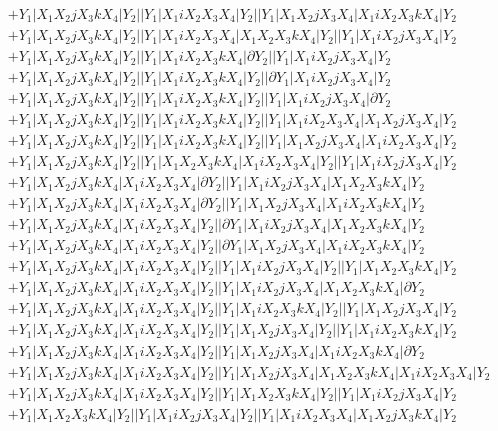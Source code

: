 \documentclass{article}[12pt]
\begin{document}
\begin{align*} 
 & +Y_1|X_1X_2jX_3kX_4|Y_2||Y_1|X_1iX_2X_3X_4|Y_2||Y_1|X_1X_2jX_3X_4|X_1iX_2X_3kX_4|Y_2\\ 
 & +Y_1|X_1X_2jX_3kX_4|Y_2||Y_1|X_1iX_2X_3X_4|X_1X_2X_3kX_4|Y_2||Y_1|X_1iX_2jX_3X_4|Y_2\\ 
 & +Y_1|X_1X_2jX_3kX_4|Y_2||Y_1|X_1iX_2X_3kX_4|\partial Y_2||Y_1|X_1iX_2jX_3X_4|Y_2\\ 
 & +Y_1|X_1X_2jX_3kX_4|Y_2||Y_1|X_1iX_2X_3kX_4|Y_2||\partial Y_1|X_1iX_2jX_3X_4|Y_2\\ 
 & +Y_1|X_1X_2jX_3kX_4|Y_2||Y_1|X_1iX_2X_3kX_4|Y_2||Y_1|X_1iX_2jX_3X_4|\partial Y_2\\ 
 & +Y_1|X_1X_2jX_3kX_4|Y_2||Y_1|X_1iX_2X_3kX_4|Y_2||Y_1|X_1iX_2X_3X_4|X_1X_2jX_3X_4|Y_2\\ 
 & +Y_1|X_1X_2jX_3kX_4|Y_2||Y_1|X_1iX_2X_3kX_4|Y_2||Y_1|X_1X_2jX_3X_4|X_1iX_2X_3X_4|Y_2\\ 
 & +Y_1|X_1X_2jX_3kX_4|Y_2||Y_1|X_1X_2X_3kX_4|X_1iX_2X_3X_4|Y_2||Y_1|X_1iX_2jX_3X_4|Y_2\\ 
 & +Y_1|X_1X_2jX_3kX_4|X_1iX_2X_3X_4|\partial Y_2||Y_1|X_1iX_2jX_3X_4|X_1X_2X_3kX_4|Y_2\\ 
 & +Y_1|X_1X_2jX_3kX_4|X_1iX_2X_3X_4|\partial Y_2||Y_1|X_1X_2jX_3X_4|X_1iX_2X_3kX_4|Y_2\\ 
 & +Y_1|X_1X_2jX_3kX_4|X_1iX_2X_3X_4|Y_2||\partial Y_1|X_1iX_2jX_3X_4|X_1X_2X_3kX_4|Y_2\\ 
 & +Y_1|X_1X_2jX_3kX_4|X_1iX_2X_3X_4|Y_2||\partial Y_1|X_1X_2jX_3X_4|X_1iX_2X_3kX_4|Y_2\\ 
 & +Y_1|X_1X_2jX_3kX_4|X_1iX_2X_3X_4|Y_2||Y_1|X_1iX_2jX_3X_4|Y_2||Y_1|X_1X_2X_3kX_4|Y_2\\ 
 & +Y_1|X_1X_2jX_3kX_4|X_1iX_2X_3X_4|Y_2||Y_1|X_1iX_2jX_3X_4|X_1X_2X_3kX_4|\partial Y_2\\ 
 & +Y_1|X_1X_2jX_3kX_4|X_1iX_2X_3X_4|Y_2||Y_1|X_1iX_2X_3kX_4|Y_2||Y_1|X_1X_2jX_3X_4|Y_2\\ 
 & +Y_1|X_1X_2jX_3kX_4|X_1iX_2X_3X_4|Y_2||Y_1|X_1X_2jX_3X_4|Y_2||Y_1|X_1iX_2X_3kX_4|Y_2\\ 
 & +Y_1|X_1X_2jX_3kX_4|X_1iX_2X_3X_4|Y_2||Y_1|X_1X_2jX_3X_4|X_1iX_2X_3kX_4|\partial Y_2\\ 
 & +Y_1|X_1X_2jX_3kX_4|X_1iX_2X_3X_4|Y_2||Y_1|X_1X_2jX_3X_4|X_1X_2X_3kX_4|X_1iX_2X_3X_4|Y_2\\ 
 & +Y_1|X_1X_2jX_3kX_4|X_1iX_2X_3X_4|Y_2||Y_1|X_1X_2X_3kX_4|Y_2||Y_1|X_1iX_2jX_3X_4|Y_2\\ 
 & +Y_1|X_1X_2X_3kX_4|Y_2||Y_1|X_1iX_2jX_3X_4|Y_2||Y_1|X_1iX_2X_3X_4|X_1X_2jX_3kX_4|Y_2\\ 

\end{align*}
\end{document}
